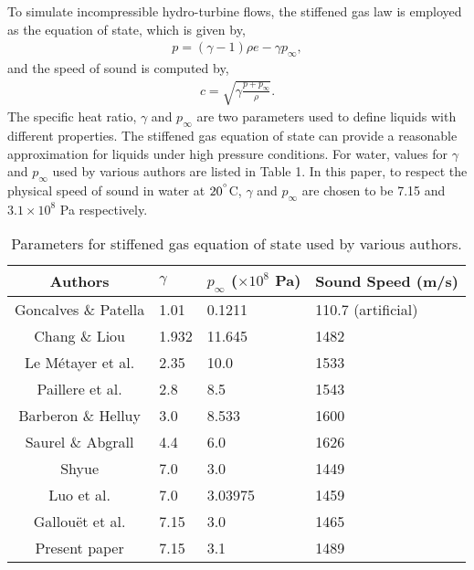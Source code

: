 To simulate incompressible hydro-turbine flows, the stiffened gas law is employed as the equation of state, which is given by,
\begin{align} 
p = (\gamma - 1)\rho e-\gamma p_{\infty},
\end{align}
and the speed of sound is computed by,
\begin{align} 
c=\sqrt{\gamma \frac{p+p_{\infty}}{\rho}}.
\end{align}
The specific heat ratio, $\gamma$ and $p_{\infty}$ are two parameters used to define liquids with different properties. The stiffened gas equation of state can provide a reasonable approximation for liquids under high pressure conditions. For water, values for $\gamma$ and $p_{\infty}$ used by various authors are listed in Table 1. In this paper, to respect the physical speed of sound in water at $20^{\degree}$C, $\gamma$ and $p_{\infty}$ are chosen to be 7.15 and $3.1\times10^{8}$ Pa respectively. 

\begin{table}[t]
\caption{Parameters for stiffened gas equation of state used by various authors.}
\begin{center}
\label{table_ASME} 
\begin{tabular}{c l l l}
\hline
Authors&$\gamma$&$p_{\infty}$ ($\times10^{8}$ Pa)&Sound Speed (m/s)\\
\hline
Goncalves \& Patella \cite{goncalves2009numerical} &1.01&0.1211&110.7 (artificial)\\
Chang \& Liou \cite{chang2007robust} &1.932&11.645&1482\\
Le M{\'e}tayer et al. \cite{le2004elaboration}&2.35&10.0&1533\\
Paillere et al. \cite{paillere2003extension}&2.8&8.5&1543\\
Barberon \& Helluy \cite{barberon2005finite}&3.0&8.533&1600\\
Saurel \& Abgrall \cite{saurel1999simple}&4.4&6.0&1626\\
Shyue \cite{shyue1999fluid}&7.0&3.0&1449\\
Luo et al. \cite{luo2004computation}&7.0&3.03975&1459\\
Gallou{\"e}t et al. \cite{gallouet2002some}&7.15&3.0&1465\\
Present paper&7.15&3.1&1489\\
\hline
\end{tabular}
\end{center}
\end{table} 
